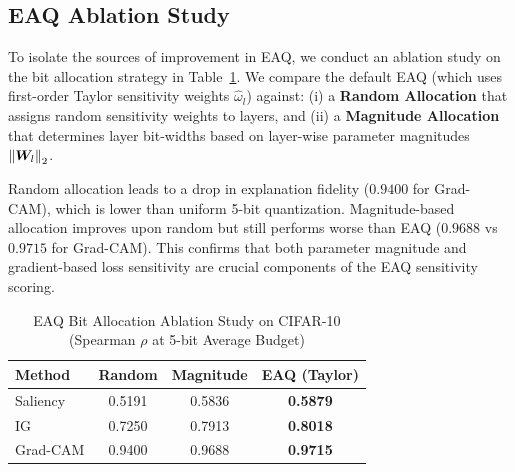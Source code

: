 \subsection{EAQ Ablation Study}
\label{sec:ablation}
To isolate the sources of improvement in EAQ, we conduct an ablation study on the bit allocation strategy in Table~\ref{tab:ablation}. We compare the default EAQ (which uses first-order Taylor sensitivity weights $\hat{\omega}_l$) against: (i) a \textbf{Random Allocation} that assigns random sensitivity weights to layers, and (ii) a \textbf{Magnitude Allocation} that determines layer bit-widths based on layer-wise parameter magnitudes $\left\lVert\bm{W}_l\right\rVert_2$. 

Random allocation leads to a drop in explanation fidelity ($0.9400$ for Grad-CAM), which is lower than uniform 5-bit quantization. Magnitude-based allocation improves upon random but still performs worse than EAQ ($0.9688$ vs $0.9715$ for Grad-CAM). This confirms that both parameter magnitude and gradient-based loss sensitivity are crucial components of the EAQ sensitivity scoring.

\begin{table}[!h]
\caption{EAQ Bit Allocation Ablation Study on CIFAR-10 (Spearman $\rho$ at 5-bit Average Budget)}
\label{tab:ablation}
\centering
\begin{tabular}{lccc}
\hline
\textbf{Method} & \textbf{Random} & \textbf{Magnitude} & \textbf{EAQ (Taylor)} \\
\hline
Saliency & 0.5191 & 0.5836 & \textbf{0.5879} \\
IG & 0.7250 & 0.7913 & \textbf{0.8018} \\
Grad-CAM & 0.9400 & 0.9688 & \textbf{0.9715} \\
\hline
\end{tabular}
\end{table}

